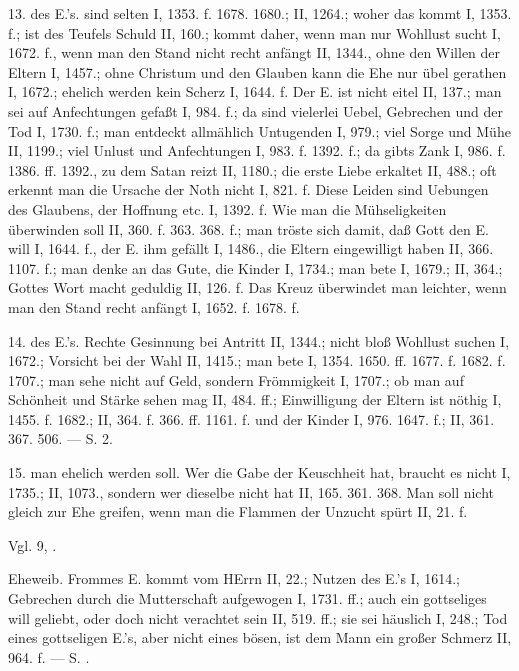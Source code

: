 13.  des E.’s.  sind selten I, 1353. f. 1678. 1680.; II, 1264.; woher das kommt I, 1353. f.; ist des Teufels Schuld II, 160.; kommt daher, wenn man nur Wohllust sucht I, 1672. f., wenn man den Stand nicht recht anfängt II, 1344., ohne den Willen der Eltern I, 1457.; ohne Christum und den Glauben kann die Ehe nur übel gerathen I, 1672.; ehelich werden kein Scherz I, 1644. f. Der E. ist nicht eitel  II, 137.; man sei auf Anfechtungen gefaßt I, 984. f.; da sind vielerlei Uebel, Gebrechen und der Tod I, 1730. f.; man entdeckt allmählich Untugenden I, 979.; viel Sorge und Mühe II, 1199.; viel Unlust und Anfechtungen I, 983. f. 1392. f.; da gibts Zank I, 986. f. 1386. ff. 1392., zu dem Satan reizt II, 1180.; die erste Liebe erkaltet II, 488.; oft erkennt man die Ursache der Noth nicht I, 821. f. Diese Leiden sind Uebungen des Glaubens, der Hoffnung etc. I, 1392. f. Wie man die Mühseligkeiten überwinden soll II, 360. f. 363. 368. f.; man tröste sich damit, daß Gott den E. will I, 1644. f., der E. ihm gefällt I, 1486., die Eltern eingewilligt haben II, 366. 1107. f.; man denke an das Gute, die Kinder I, 1734.; man bete I, 1679.; II, 364.; Gottes Wort macht geduldig II, 126. f. Das Kreuz überwindet man leichter, wenn man den Stand recht anfängt I, 1652. f. 1678. f.

14.  des E.’s. Rechte Gesinnung bei Antritt II, 1344.; nicht bloß Wohllust suchen I, 1672.; Vorsicht bei der Wahl II, 1415.; man bete I, 1354. 1650. ff. 1677. f. 1682. f. 1707.; man sehe nicht auf Geld, sondern Frömmigkeit I, 1707.; ob man auf Schönheit und Stärke sehen mag II, 484. ff.; Einwilligung der Eltern ist nöthig I, 1455. f. 1682.; II, 364. f. 366. ff. 1161. f. und der Kinder I, 976. 1647. f.; II, 361. 367. 506. — S.  2.

15.  man ehelich werden soll. Wer die Gabe der Keuschheit hat, braucht es nicht I, 1735.; II, 1073., sondern wer dieselbe nicht hat II, 165. 361. 368. Man soll nicht gleich zur Ehe greifen, wenn man die Flammen der Unzucht spürt II, 21. f.

Vgl.  9, .

Eheweib. Frommes E. kommt vom HErrn II, 22.; Nutzen des E.’s I, 1614.; Gebrechen durch die Mutterschaft aufgewogen I, 1731. ff.; auch ein gottseliges will geliebt, oder doch nicht verachtet sein II, 519. ff.; sie sei häuslich I, 248.; Tod eines gottseligen E.’s, aber nicht eines bösen, ist dem Mann ein großer Schmerz II, 964. f. — S. .

